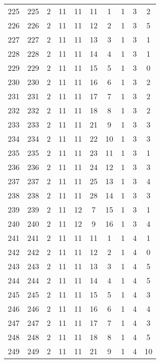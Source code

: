 \begin{longtable}{cccccccccc}
  225 & 225 &   2 &  11 &  11 &  11 &   1 &   1 &   3 &   2 \\ 
  226 & 226 &   2 &  11 &  11 &  12 &   2 &   1 &   3 &   5 \\ 
  227 & 227 &   2 &  11 &  11 &  13 &   3 &   1 &   3 &   1 \\ 
  228 & 228 &   2 &  11 &  11 &  14 &   4 &   1 &   3 &   1 \\ 
  229 & 229 &   2 &  11 &  11 &  15 &   5 &   1 &   3 &   0 \\ 
  230 & 230 &   2 &  11 &  11 &  16 &   6 &   1 &   3 &   2 \\ 
  231 & 231 &   2 &  11 &  11 &  17 &   7 &   1 &   3 &   2 \\ 
  232 & 232 &   2 &  11 &  11 &  18 &   8 &   1 &   3 &   2 \\ 
  233 & 233 &   2 &  11 &  11 &  21 &   9 &   1 &   3 &   3 \\ 
  234 & 234 &   2 &  11 &  11 &  22 &  10 &   1 &   3 &   3 \\ 
  235 & 235 &   2 &  11 &  11 &  23 &  11 &   1 &   3 &   1 \\ 
  236 & 236 &   2 &  11 &  11 &  24 &  12 &   1 &   3 &   3 \\ 
  237 & 237 &   2 &  11 &  11 &  25 &  13 &   1 &   3 &   4 \\ 
  238 & 238 &   2 &  11 &  11 &  28 &  14 &   1 &   3 &   3 \\ 
  239 & 239 &   2 &  11 &  12 &   7 &  15 &   1 &   3 &   1 \\ 
  240 & 240 &   2 &  11 &  12 &   9 &  16 &   1 &   3 &   4 \\ 
  241 & 241 &   2 &  11 &  11 &  11 &   1 &   1 &   4 &   1 \\ 
  242 & 242 &   2 &  11 &  11 &  12 &   2 &   1 &   4 &   0 \\ 
  243 & 243 &   2 &  11 &  11 &  13 &   3 &   1 &   4 &   5 \\ 
  244 & 244 &   2 &  11 &  11 &  14 &   4 &   1 &   4 &   5 \\ 
  245 & 245 &   2 &  11 &  11 &  15 &   5 &   1 &   4 &   3 \\ 
  246 & 246 &   2 &  11 &  11 &  16 &   6 &   1 &   4 &   4 \\ 
  247 & 247 &   2 &  11 &  11 &  17 &   7 &   1 &   4 &   3 \\ 
  248 & 248 &   2 &  11 &  11 &  18 &   8 &   1 &   4 &   5 \\ 
  249 & 249 &   2 &  11 &  11 &  21 &   9 &   1 &   4 &  10 \\ 

\end{longtable}
